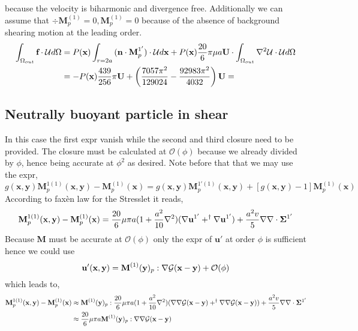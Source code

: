 \documentclass[12pt]{My_preprint}
\begin{document}
because the velocity is biharmonic and divergence free. 
Additionally we can assume that $\div \textbf{M}_{p}^{(1)} = 0,\textbf{M}^{(1)}_p =0$ because of the absence of background shearing motion at the leading order. 
\begin{align}
    \intO[out]{\textbf{f}\cdot \mathcal{U}}
    &=
    P(\textbf{x})\int_{r=2a}{(\textbf{n} \cdot \textbf{M}_p^{1'})\cdot \mathcal{U}}d\textbf{x}
    + P(\textbf{x})\frac{20}{6}\pi\mu a \textbf{U}\cdot \intO[out]{\grad^2\mathcal{U}\cdot \mathcal{U}}\\
    &
    = -P(\textbf{x})\frac{439}{256}\pi\textbf{U}
    + 
    \left( \frac{7057 \pi^{2}}{129024}  - \frac{92983 \pi^{2}}{4032}\right)\textbf{U}
    =
\end{align}

\subsection*{Neutrally buoyant particle in shear}
In this case the first expr vanish while the  second and third closure need to be provided. 
The closure must be calculated at $\mathcal{O}(\phi)$ because we already divided by $\phi$, hence being accurate at $\phi^2$ as desired. 
Note before that that we may use the expr, 
\begin{equation}
    g(\textbf{x},\textbf{y})\textbf{M}_{p}^{1(1)}(\textbf{x},\textbf{y}) - \textbf{M}_{p}^{(1)}(\textbf{x})
    =
    g(\textbf{x},\textbf{y})\textbf{M}_{p}^{1'(1)}(\textbf{x},\textbf{y}) 
    + [g(\textbf{x},\textbf{y})-1]\textbf{M}_{p}^{(1)}(\textbf{x})
\end{equation}
According to faxèn law for the Stresslet it reads, 
\begin{equation}
    \textbf{M}_{p}^{1(1)}(\textbf{x},\textbf{y})
    - \textbf{M}_{p}^{(1)}(\textbf{x})
    =
    \frac{20}{6}\mu\pi a (1 + \frac{a^2}{10}\grad^2)(\grad \textbf{u}^{1'}  + ^\dagger\grad \textbf{u}^{1'})
    + \frac{a^2 v}{5} \grad\grad\cdot \bm\Sigma^{1'}
\end{equation}
Because \textbf{M} must be accurate at $\mathcal{O}(\phi)$ only the expr of $\textbf{u}'$ at order $\phi$ is sufficient hence we could use 
\begin{equation}
    \textbf{u}'(\textbf{x},\textbf{y}) = \textbf{M}^{(1)}(\textbf{y})_p: \grad \mathcal{G}(\textbf{x}-\textbf{y}) + \mathcal{O}(\phi)
\end{equation}
which leads to,
\begin{align}
    \textbf{M}_{p}^{1(1)}(\textbf{x},\textbf{y})
    - \textbf{M}_{p}^{(1)}(\textbf{x})
    &\approx
    \textbf{M}^{(1)}(\textbf{y})_p:
    \frac{20}{6}\mu\pi a (1 + \frac{a^2}{10}\grad^2)(\grad \grad \mathcal{G}(\textbf{x}-\textbf{y})  + ^\dagger\grad \grad \mathcal{G}(\textbf{x}-\textbf{y}))
    + \frac{a^2 v}{5} \grad\grad\cdot \bm\Sigma^{1'}\\
    &\approx
    \frac{20}{6}\mu\pi a 
    \textbf{M}^{(1)}(\textbf{y})_p:\grad \grad \mathcal{G}(\textbf{x}-\textbf{y})
\end{align}
\end{document}
